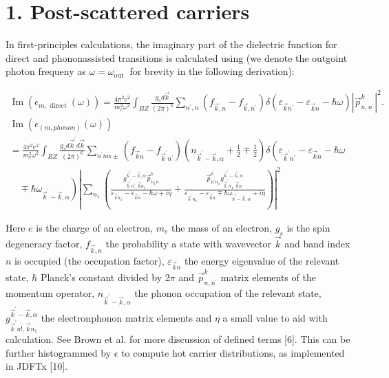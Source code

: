 \documentclass[10pt]{article}
\begin{document}
\section*{1. Post-scattered carriers}
In first-principles calculations, the imaginary part of the dielectric function for direct and phononassisted transitions is calculated using (we denote the outgoint photon frequeny as $\omega=\omega_{\text {out }}$ for brevity in the following derivation):

$$
\begin{gathered}
\operatorname{Im}\left(\epsilon_{m, \text { direct }}(\omega)\right)=\frac{4 \pi^{2} e^{2}}{m_{e}^{2} \omega^{2}} \int_{B Z} \frac{g_{s} d \vec{k}}{(2 \pi)^{3}} \sum_{n^{\prime}, n}\left(f_{\vec{k}, n}-f_{\vec{k}, n^{\prime}}\right) \delta\left(\varepsilon_{\vec{k} n^{\prime}}-\varepsilon_{\vec{k} n}-\hbar \omega\right)\left|\vec{p}_{n, n^{\prime}}^{k}\right|^{2} . \\
\operatorname{Im}\left(\epsilon_{(m, p h o n o n)}(\omega)\right) \\
=\frac{4 \pi^{2} e^{2}}{m_{e}^{2} \omega^{2}} \int_{B Z} \frac{g_{s} d \vec{k}^{\prime} d \vec{k}}{(2 \pi)^{6}} \sum_{n^{\prime} n \alpha \pm}\left(f_{\vec{k} n}-f_{\vec{k}^{\prime} n^{\prime}}\right)\left(n_{\vec{k}^{\prime}-\vec{k}, \alpha}+\frac{1}{2} \mp \frac{1}{2}\right) \delta\left(\varepsilon_{\vec{k}^{\prime} n^{\prime}}-\varepsilon_{\vec{k} n}-\hbar \omega\right. \\
\left.\quad \mp \hbar \omega_{\vec{k}^{\prime}-\vec{k}, \alpha}\right)\left|\sum_{n_{1}}\left(\frac{g_{\vec{k}^{\prime} n^{\prime}, \vec{k} n_{1}}^{\vec{k}^{\prime}-\vec{k}, \alpha} \vec{p}_{n_{1} n}^{k}}{\varepsilon_{\vec{k} n_{1}}-\varepsilon_{\vec{k} n}-\hbar \omega+i \eta}+\frac{\vec{p}_{n^{\prime} n_{1}}^{k} g_{\vec{k}^{\prime} n_{1}, \vec{k} n}^{\vec{k}^{\prime}-\vec{k}, \alpha}}{\varepsilon_{\vec{k}^{\prime} n_{1}}-\varepsilon_{\vec{k} n} \mp \hbar \omega_{\overrightarrow{k^{\prime}}-\vec{k}, \alpha}+i \eta}\right)\right|^{2}
\end{gathered}
$$

Here $e$ is the charge of an electron, $m_{e}$ the mass of an electron, $g_{s}$ is the spin degeneracy factor, $f_{\vec{k}, n}$ the probability a state with wavevector $\vec{k}$ and band index $n$ is occupied (the occupation factor), $\varepsilon_{\vec{k} n}$ the energy eigenvalue of the relevant state, $\hbar$ Planck's constant divided by $2 \pi$ and $\vec{p}_{n, n^{\prime}}^{k}$ matrix elements of the momentum operator, $n_{\vec{k}^{\prime}-\vec{k}, \alpha}$ the phonon occupation of the relevant state, $g_{\vec{k}^{\prime} n!, \vec{k} n_{1}}^{\vec{k}^{\prime}-\vec{k}, \alpha}$ the electronphonon matrix elements and $\eta$ a small value to aid with calculation. See Brown et al. for more discussion of defined terms [6]. This can be further histogrammed by $\epsilon$ to compute hot carrier distributions, as implemented in JDFTx [10].
\end{document}
